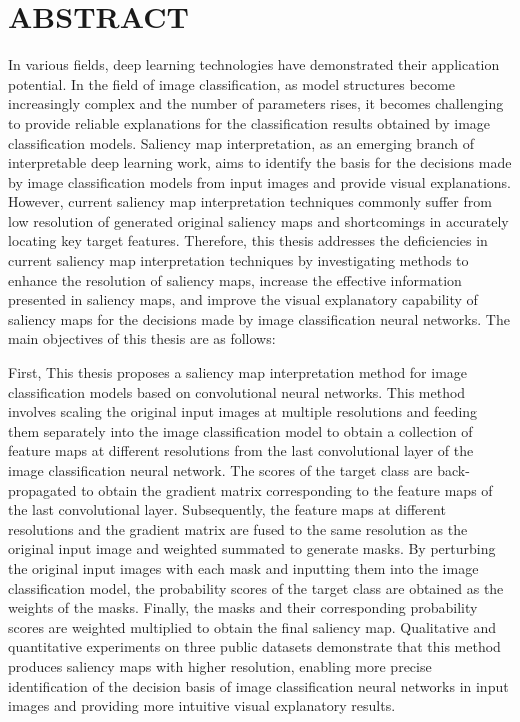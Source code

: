



\chapter{ABSTRACT}
\xiaosi

In various fields, deep learning technologies have demonstrated their application potential. In the field of image classification, as model structures become increasingly complex and the number of parameters rises, it becomes challenging to provide reliable explanations for the classification results obtained by image classification models. Saliency map interpretation, as an emerging branch of interpretable deep learning work, aims to identify the basis for the decisions made by image classification models from input images and provide visual explanations. However, current saliency map interpretation techniques commonly suffer from low resolution of generated original saliency maps and shortcomings in accurately locating key target features. Therefore, this thesis addresses the deficiencies in current saliency map interpretation techniques by investigating methods to enhance the resolution of saliency maps, increase the effective information presented in saliency maps, and improve the visual explanatory capability of saliency maps for the decisions made by image classification neural networks. The main objectives of this thesis are as follows:

First, This thesis proposes a saliency map interpretation method for image classification models based on convolutional neural networks. This method involves scaling the original input images at multiple resolutions and feeding them separately into the image classification model to obtain a collection of feature maps at different resolutions from the last convolutional layer of the image classification neural network. The scores of the target class are back-propagated to obtain the gradient matrix corresponding to the feature maps of the last convolutional layer. Subsequently, the feature maps at different resolutions and the gradient matrix are fused to the same resolution as the original input image and weighted summated to generate masks. By perturbing the original input images with each mask and inputting them into the image classification model, the probability scores of the target class are obtained as the weights of the masks. Finally, the masks and their corresponding probability scores are weighted multiplied to obtain the final saliency map. Qualitative and quantitative experiments on three public datasets demonstrate that this method produces saliency maps with higher resolution, enabling more precise identification of the decision basis of image classification neural networks in input images and providing more intuitive visual explanatory results.


